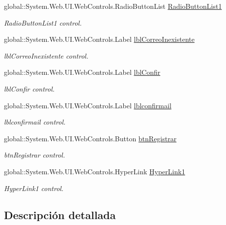 \begin{DoxyCompactItemize}
global\+::\+System.\+Web.\+U\+I.\+Web\+Controls.\+Radio\+Button\+List \mbox{\hyperlink{classwebprueba_1_1_registro_a4aa86cfab217a2d7f51bf4065b7b0293}{Radio\+Button\+List1}}
\begin{DoxyCompactList}\small\item\em Radio\+Button\+List1 control. \end{DoxyCompactList}\item 
global\+::\+System.\+Web.\+U\+I.\+Web\+Controls.\+Label \mbox{\hyperlink{classwebprueba_1_1_registro_a3d93b0b966ee57fd016644ade25ec339}{lbl\+Correo\+Inexistente}}
\begin{DoxyCompactList}\small\item\em lbl\+Correo\+Inexistente control. \end{DoxyCompactList}\item 
global\+::\+System.\+Web.\+U\+I.\+Web\+Controls.\+Label \mbox{\hyperlink{classwebprueba_1_1_registro_a42bc2caf84771b1b7e73df6e3af943f1}{lbl\+Confir}}
\begin{DoxyCompactList}\small\item\em lbl\+Confir control. \end{DoxyCompactList}\item 
global\+::\+System.\+Web.\+U\+I.\+Web\+Controls.\+Label \mbox{\hyperlink{classwebprueba_1_1_registro_ace388583f32ec34c02d40b9d43db2112}{lblconfirmail}}
\begin{DoxyCompactList}\small\item\em lblconfirmail control. \end{DoxyCompactList}\item 
global\+::\+System.\+Web.\+U\+I.\+Web\+Controls.\+Button \mbox{\hyperlink{classwebprueba_1_1_registro_a01b1342a8e6d76fedf0cc770cf7b4c12}{btn\+Registrar}}
\begin{DoxyCompactList}\small\item\em btn\+Registrar control. \end{DoxyCompactList}\item 
global\+::\+System.\+Web.\+U\+I.\+Web\+Controls.\+Hyper\+Link \mbox{\hyperlink{classwebprueba_1_1_registro_ad2c6a3f182fe442ffc96eb83434b4bbb}{Hyper\+Link1}}
\begin{DoxyCompactList}\small\item\em Hyper\+Link1 control. \end{DoxyCompactList}\end{DoxyCompactItemize}


\subsection{Descripción detallada}


